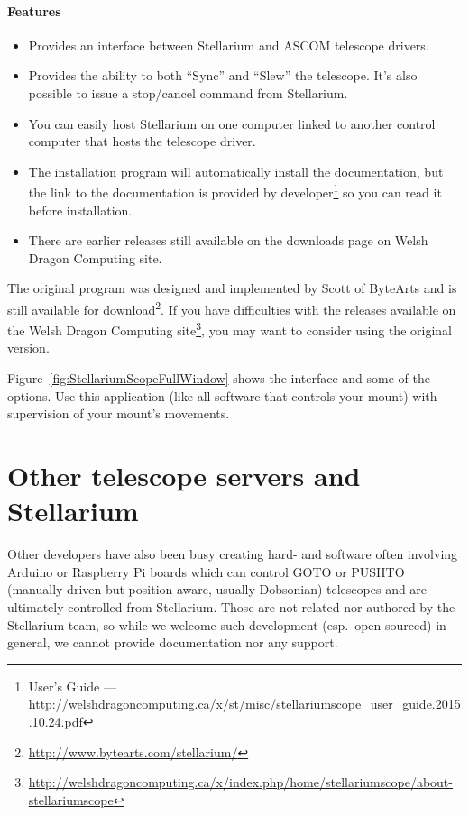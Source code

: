 \paragraph{Features}
\begin{itemize}
\item Provides an interface between Stellarium and ASCOM telescope drivers.
\item Provides the ability to both ``Sync'' and ``Slew'' the
  telescope. It's also possible to issue a stop/cancel command from
  Stellarium.
\item You can easily host Stellarium on one computer linked to another
  control computer that hosts the telescope driver.
\item The installation program will automatically install the
  documentation, but the link to the documentation is provided
  by developer\footnote{ User's Guide --- \url{http://welshdragoncomputing.ca/x/st/misc/stellariumscope_user_guide.2015.10.24.pdf}} so you can read it before installation.
\item There are earlier releases still available on the downloads page on
  Welsh Dragon Computing site.
\end{itemize}

The original  program was designed and implemented by
Scott of ByteArts and is still available for
download\footnote{\url{http://www.bytearts.com/stellarium/}}. If you
have difficulties with the releases available on the Welsh Dragon
Computing
site\footnote{\url{http://welshdragoncomputing.ca/x/index.php/home/stellariumscope/about-stellariumscope}},
you may want to consider using the original version.


Figure~\ref{fig:StellariumScopeFullWindow} shows the interface and
some of the options.  Use this application (like all software that
controls your mount) with supervision of your mount's movements.

\section{Other telescope servers and Stellarium}
\label{sec:plugins:TelescopeControl:Other}

Other developers have also been busy creating hard- and software often
involving Arduino or Raspberry Pi boards which can control GOTO or
PUSHTO (manually driven but position-aware, usually Dobsonian)
telescopes and are ultimately controlled from Stellarium. Those are
not related nor authored by the Stellarium team, so while we welcome
such development (esp.\ open-sourced) in general, we cannot provide
documentation nor any support.


